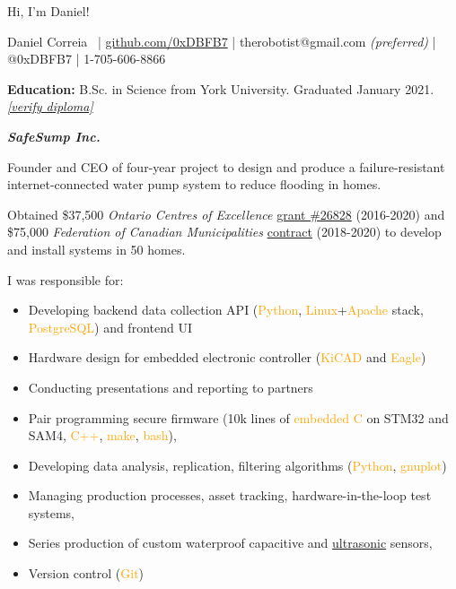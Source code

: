 \documentclass[fleqn,11pt]{article}
\newcommand{\ressection}[1]{\textbf{{\Large \textit{#1}}}\xrfill[0.1ex]{0.6pt}}
\newcommand{\sk}[1]{\textcolor{orange}{#1}}
\newcommand{\itemoptions}{\setlength{\itemindent}{-10pt} \setlength\itemsep{-1em}}
\begin{document}
\begingroup
{}\selectfont

{\Huge Hi, I'm Daniel!}

\endgroup


\begin{center}
\small{{Daniel Correia}\  | \href{https://github.com/0xDBFB7}{github.com/0xDBFB7} | therobotist@gmail.com \textit{(preferred)} | @0xDBFB7 | 1-705-606-8866}\\
\light{\makebox[\linewidth]{\rule{\textwidth}{0.4pt}}}
\end{center}


\begin{tcolorbox}
\textbf{Education:} B.Sc. in Science from York University. Graduated January 2021. \href{https://learner.mycreds.ca/#/sharelink/b664abe7-53a7-4d64-a0f1-bef16337edd0/57724eeb-34ab-4b79-b2a6-cd6bc311039e}{\textit{[verify diploma]}}
\end{tcolorbox}


\ressection{SafeSump Inc.}

Founder and CEO of four-year project to design and produce a failure-resistant internet-connected water pump system to reduce flooding in homes.

Obtained \$37,500 \textit{Ontario Centres of Excellence} \href{https://drive.google.com/file/d/1WXrxVwTggaL7WEvLv6DgJ891fSo7LqqP/view?usp=sharing}{grant \#26828} (2016-2020) and \$75,000 \textit{Federation of Canadian Municipalities} \href{https://drive.google.com/file/d/11pdJNzYDE-28X3m0rH8mE4cxoliTJZGH/view?usp=sharing}{contract} (2018-2020) to develop and install systems in 50 homes.

I was responsible for:
\begin{itemize}\itemoptions
\item Developing backend data collection API (\sk{Python}, \sk{Linux}+\sk{Apache} stack, \sk{PostgreSQL}) and frontend UI
\item Hardware design for embedded electronic controller (\sk{KiCAD} and \sk{Eagle})
\item  Conducting presentations and reporting to partners
\item Pair programming secure firmware (10k lines of \sk{embedded C} on STM32 and SAM4, \sk{C++}, \sk{make}, \sk{bash}), 
\item Developing data analysis, replication, filtering algorithms (\sk{Python}, \sk{gnuplot})
\item Managing production processes, asset tracking, hardware-in-the-loop test systems, 
\item Series production of custom waterproof capacitive and \href{https://github.com/0xDBFB7/UltimateUltrasonicAmplifier}{ultrasonic} sensors,
\item Version control (\sk{Git})
\end{itemize}
\end{document}
